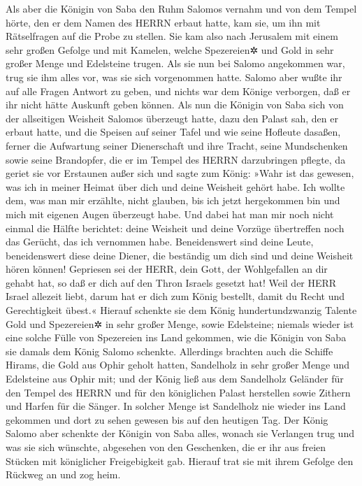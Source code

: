 Als aber die Königin von Saba den Ruhm Salomos vernahm und
von dem Tempel hörte, den er dem Namen des HERRN erbaut hatte, kam sie,
um ihn mit Rätselfragen auf die Probe zu stellen. Sie kam
also nach Jerusalem mit einem sehr großen Gefolge und mit Kamelen,
welche Spezereien✲ und Gold in sehr großer Menge und Edelsteine trugen.
Als sie nun bei Salomo angekommen war, trug sie ihm alles vor, was sie
sich vorgenommen hatte. Salomo aber wußte ihr auf alle
Fragen Antwort zu geben, und nichts war dem Könige verborgen, daß er ihr
nicht hätte Auskunft geben können. Als nun die Königin von
Saba sich von der allseitigen Weisheit Salomos überzeugt hatte, dazu den
Palast sah, den er erbaut hatte, und die Speisen auf
seiner Tafel und wie seine Hofleute dasaßen, ferner die Aufwartung
seiner Dienerschaft und ihre Tracht, seine Mundschenken sowie seine
Brandopfer, die er im Tempel des HERRN darzubringen pflegte, da geriet
sie vor Erstaunen außer sich und sagte zum König: »Wahr
ist das gewesen, was ich in meiner Heimat über dich und deine Weisheit
gehört habe. Ich wollte dem, was man mir erzählte, nicht
glauben, bis ich jetzt hergekommen bin und mich mit eigenen Augen
überzeugt habe. Und dabei hat man mir noch nicht einmal die Hälfte
berichtet: deine Weisheit und deine Vorzüge übertreffen noch das
Gerücht, das ich vernommen habe. Beneidenswert sind deine
Leute, beneidenswert diese deine Diener, die beständig um dich sind und
deine Weisheit hören können! Gepriesen sei der HERR, dein
Gott, der Wohlgefallen an dir gehabt hat, so daß er dich auf den Thron
Israels gesetzt hat! Weil der HERR Israel allezeit liebt, darum hat er
dich zum König bestellt, damit du Recht und Gerechtigkeit übest.«
Hierauf schenkte sie dem König hundertundzwanzig Talente
Gold und Spezereien✲ in sehr großer Menge, sowie Edelsteine; niemals
wieder ist eine solche Fülle von Spezereien ins Land gekommen, wie die
Königin von Saba sie damals dem König Salomo schenkte.
Allerdings brachten auch die Schiffe Hirams, die Gold aus
Ophir geholt hatten, Sandelholz in sehr großer Menge und Edelsteine aus
Ophir mit; und der König ließ aus dem Sandelholz Geländer
für den Tempel des HERRN und für den königlichen Palast herstellen sowie
Zithern und Harfen für die Sänger. In solcher Menge ist Sandelholz nie
wieder ins Land gekommen und dort zu sehen gewesen bis auf den heutigen
Tag. Der König Salomo aber schenkte der Königin von Saba
alles, wonach sie Verlangen trug und was sie sich wünschte, abgesehen
von den Geschenken, die er ihr aus freien Stücken mit königlicher
Freigebigkeit gab. Hierauf trat sie mit ihrem Gefolge den Rückweg an und
zog heim.

